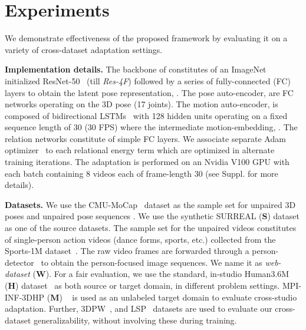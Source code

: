 \documentclass{article}
\begin{document}
\section{Experiments} \vspace{-3mm}
\label{sec:experiments}





We demonstrate effectiveness of the proposed framework by evaluating it on a variety of cross-dataset adaptation settings. 



\noindent
\textbf{Implementation details.} The backbone of  constitutes of an ImageNet initialized ResNet-50~\cite{he2016deep} (till \textit{Res-4F}) followed by a series of fully-connected (FC) layers to obtain the latent pose representation, . The pose auto-encoder,  are FC networks operating on the 3D pose  (17 joints). The motion auto-encoder,  is composed of bidirectional LSTMs~\cite{graves2005framewise} with 128 hidden units operating on a fixed sequence length of 30 (30 FPS) where the intermediate motion-embedding, . The relation networks constitute of simple FC layers. We associate separate Adam optimizer~\cite{kingma2014adam} to each relational energy term which are optimized in alternate training iterations. The adaptation is performed on an Nvidia V100 GPU with each batch containing 8 videos each of frame-length 30 (see Suppl. for more details).


\noindent
\textbf{Datasets.} We use the CMU-MoCap~\cite{cmumocap} dataset as the sample set for unpaired 3D poses  and unpaired pose sequences . {We use the synthetic SURREAL (\textbf{S}) dataset \cite{varol2017learning} as one of the source datasets.}
The sample set for the unpaired videos  constitutes of single-person action videos (dance forms, sports, etc.) collected from the Sports-1M dataset~\cite{KarpathyCVPR14}. The raw video frames are forwarded through a person-detector~\cite{ren2015faster} to obtain the person-focused image sequences. We name it as \textit{web-dataset} (\textbf{W}). For a fair evaluation, we use the standard, in-studio Human3.6M (\textbf{H}) dataset~\cite{ionescu2013human3} as both source or target domain, in different problem settings. MPI-INF-3DHP (\textbf{M}) ~\cite{mehta2017monocular} is used as an unlabeled target domain to evaluate cross-studio adaptation. Further, 3DPW~\cite{von2018recovering}, and LSP~\cite{johnson2010clustered} datasets are used to evaluate our cross-dataset generalizability, without involving these during training.
\end{document}
